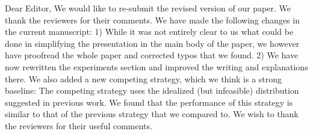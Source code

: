 Dear Editor,
We would like to re-submit the revised version of our paper. We thank the reviewers for their comments. We have made the following changes in the current manuscript:
1) While it was not entirely clear to us what could be done in simplifying the presentation in the main body of the paper, we however have proofread the whole paper and corrected typos that we found.
2) We have now rewritten the experiments section and improved the writing and explanations there.
We also added a new competing strategy, which we think is a strong baseline: The competing strategy uses the idealized
(but infeasible) distribution suggested in previous work. We found that the performance of this strategy is similar to that of the previous strategy that we compared to.
We wish to thank the reviewers for their useful comments. 


